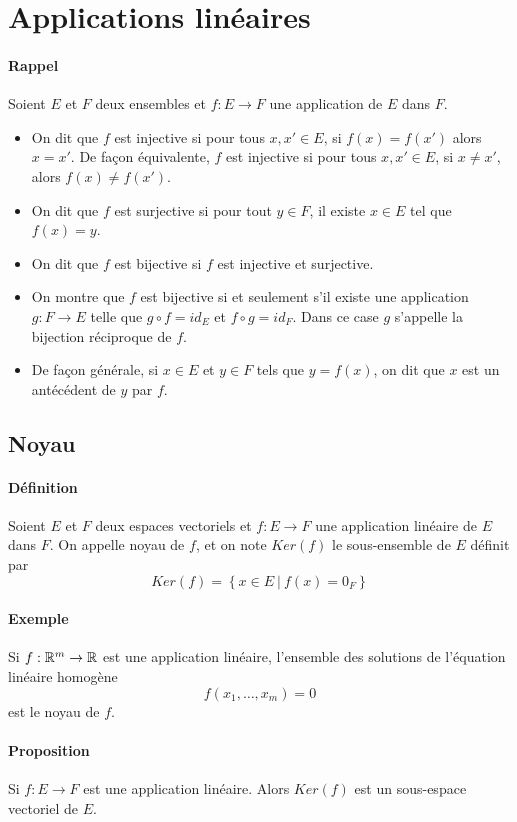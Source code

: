 %
%
\section{Applications linéaires}
%
%
\paragraph{Rappel} Soient $E$ et $F$ deux ensembles et $f: E \rightarrow F$ une application de $E$ dans $F$.
\begin{itemize}
 \item On dit que $f$ est injective si pour tous $x, x' \in E$, si $f(x) = f(x')$ alors $x=x'$. De façon équivalente, $f$ est injective si pour tous $x, x' \in E$, si $x \neq x'$, alors $f(x) \neq f(x')$.
  \item On dit que $f$ est surjective si pour tout $y \in F$, il existe $x \in E$ tel que $f(x) = y$. 
  \item On dit que $f$ est bijective si $f$ est injective et surjective.
  \item On montre que $f$ est bijective si et seulement s'il existe une application $g: F \rightarrow E$ telle que $g \circ f = id_E$ et $f \circ g = id_F$. Dans ce case $g$ s'appelle la bijection réciproque de $f$.
  \item De façon générale, si $x \in E$ et $y \in F$ tels que $y = f(x)$, on dit que $x$ est un antécédent de $y$ par $f$.
\end{itemize}

%
\subsection{Noyau}
%
\paragraph{Définition} Soient $E$ et $F$ deux espaces vectoriels et $f: E \rightarrow F$ une application linéaire de $E$ dans $F$. On appelle noyau de $f$, et on note $Ker(f)$ le sous-ensemble de $E$ définit par
$$Ker(f) = \left\{ x\in E ~ \vert ~ f(x) = 0_F \right\}$$

\paragraph{Exemple} Si $f: \mathbb{R}^m \rightarrow \mathbb{R}$ est une application linéaire, l'ensemble des solutions de l'équation linéaire homogène
$$f(x_1, \ldots, x_m) = 0$$
est le noyau de $f$.

\paragraph{Proposition} Si $f: E \rightarrow F$ est une application linéaire. Alors $Ker(f)$ est un sous-espace vectoriel de $E$.

